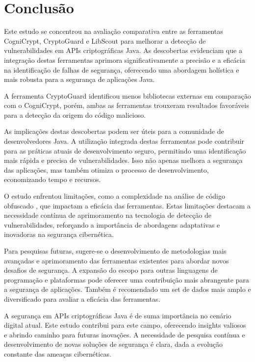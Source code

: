 \section{Conclusão}

Este estudo se concentrou na avaliação comparativa entre as ferramentas CogniCrypt, CryptoGuard e LibScout para melhorar a detecção de vulnerabilidades em APIs criptográficas Java. As descobertas evidenciam que a integração destas ferramentas aprimora significativamente a precisão e a eficácia na identificação de falhas de segurança, oferecendo uma abordagem holística e mais robusta para a segurança de aplicações Java.

A ferramenta CryptoGuard identificou menos bibliotecas externas em comparação com o CogniCrypt, porém, ambas as ferramentas trouxeram resultados favoráveis para a detecção da origem do código malicioso. 

As implicações destas descobertas podem ser úteis para a comunidade de desenvolvedores Java. A utilização integrada destas ferramentas pode contribuir para as práticas atuais de desenvolvimento seguro, permitindo uma identificação mais rápida e precisa de vulnerabilidades. Isso não apenas melhora a segurança das aplicações, mas também otimiza o processo de desenvolvimento, economizando tempo e recursos.

O estudo enfrentou limitações, como a complexidade na análise de código obfuscado \cite{api_misuses_zhang}, que impactam a eficácia das ferramentas. Estas limitações destacam a necessidade contínua de aprimoramento na tecnologia de detecção de vulnerabilidades, reforçando a importância de abordagens adaptativas e inovadoras na segurança cibernética.

Para pesquisas futuras, sugere-se o desenvolvimento de metodologias mais avançadas e aprimoramento das ferramentas existentes para abordar novos desafios de segurança. A expansão do escopo para outras linguagens de programação e plataformas pode oferecer uma contribuição mais abrangente para a segurança de aplicações. Também é recomendado um set de dados mais amplo e diversificado para avaliar a eficácia das ferramentas.

A segurança em APIs criptográficas Java é de suma importância no cenário digital atual. Este estudo contribui para este campo, oferecendo insights valiosos e abrindo caminho para futuras inovações. A necessidade de pesquisa contínua e desenvolvimento de novas soluções de segurança é clara, dada a evolução constante das ameaças cibernéticas.

